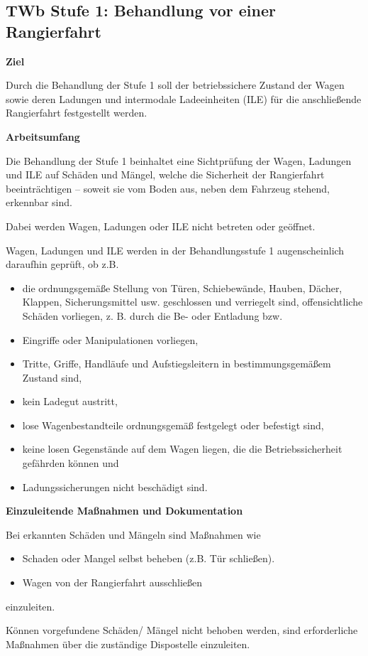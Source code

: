 \subsection{TWb Stufe 1: Behandlung vor einer Rangierfahrt}
\textbf{Ziel}\par
Durch die Behandlung der Stufe 1 soll der betriebssichere
Zustand der Wagen sowie deren Ladungen und intermodale
Ladeeinheiten (ILE) für die anschließende Rangierfahrt
festgestellt werden.\par
\textbf{Arbeitsumfang}\par
Die Behandlung der Stufe 1 beinhaltet eine Sichtprüfung
der Wagen, Ladungen und ILE auf Schäden und Mängel,
welche die Sicherheit der Rangierfahrt beeinträchtigen –
soweit sie vom Boden aus, neben dem Fahrzeug stehend,
erkennbar sind.\par
Dabei werden Wagen, Ladungen oder ILE nicht betreten
oder geöffnet.\par
Wagen, Ladungen und ILE werden in der Behandlungsstufe
1 augenscheinlich daraufhin geprüft, ob z.B.
\begin{itemize}
    \item die ordnungsgemäße Stellung von Türen, Schiebewände, Hauben, Dächer, Klappen, Sicherungsmittel usw. geschlossen und verriegelt sind, offensichtliche Schäden vorliegen, z. B. durch die Be- oder Entladung bzw.
    \item Eingriffe oder Manipulationen vorliegen,
    \item Tritte, Griffe, Handläufe und Aufstiegsleitern in bestimmungsgemäßem Zustand sind,
    \item kein Ladegut austritt,
    \item lose Wagenbestandteile ordnungsgemäß festgelegt oder befestigt sind,
    \item keine losen Gegenstände auf dem Wagen liegen, die die Betriebssicherheit gefährden können und
    \item Ladungssicherungen nicht beschädigt sind.
\end{itemize}
\textbf{Einzuleitende Maßnahmen und Dokumentation}\par
Bei erkannten Schäden und Mängeln sind Maßnahmen wie
\begin{itemize}
    \item Schaden oder Mangel selbst beheben (z.B. Tür schließen).
    \item Wagen von der Rangierfahrt ausschließen
\end{itemize}
einzuleiten.\par
Können vorgefundene Schäden/ Mängel nicht behoben
werden, sind erforderliche Maßnahmen über die zuständige
Dispostelle einzuleiten.
